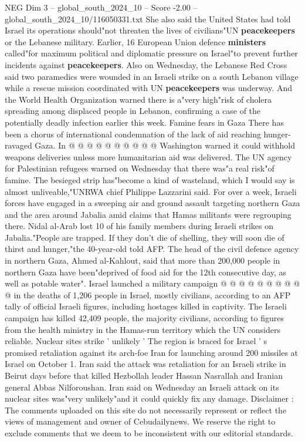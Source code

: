 \begin{textsample}{NEG Dim 3 – global\_south\_2024\_10 – Score -2.00 – global\_south\_2024\_10/116050331.txt}
She also said the United States had told Israel its operations should"not threaten the lives of civilians"UN \textbf{peacekeepers} or the Lebanese military.
Earlier, 16 European Union defence \textbf{ministers} called"for maximum political and diplomatic pressure on Israel"to prevent further incidents against \textbf{peacekeepers}.
Also on Wednesday, the Lebanese Red Cross said two paramedics were wounded in an Israeli strike on a south Lebanon village while a rescue mission coordinated with UN \textbf{peacekeepers} was underway.
And the World Health Organization warned there is a"very high"risk of cholera spreading among displaced people in Lebanon, confirming a case of the potentially deadly infection earlier this week.
Famine fears in Gaza There has been a chorus of international condemnation of the lack of aid reaching hunger-ravaged Gaza.
In @ @ @ @ @ @ @ @ @ @ Washington warned it could withhold weapons deliveries unless more humanitarian aid was delivered.
The UN agency for Palestinian refugees warned on Wednesday that there was"a real risk"of famine.
The besieged strip has"become a kind of wasteland, which I would say is almost unliveable,"UNRWA chief Philippe Lazzarini said.
For over a week, Israeli forces have engaged in a sweeping air and ground assault targeting northern Gaza and the area around Jabalia amid claims that Hamas militants were regrouping there.
Nidal al-Arab lost 10 of his family members during Israeli strikes on Jabalia."People are trapped.
If they don't die of shelling, they will soon die of thirst and hunger,"the 40-year-old told AFP.
The head of the civil defence agency in northern Gaza, Ahmed al-Kahlout, said that more than 200,000 people in northern Gaza have been"deprived of food aid for the 12th consecutive day, as well as potable water".
Israel launched a military campaign @ @ @ @ @ @ @ @ @ @ in the deaths of 1,206 people in Israel, mostly civilians, according to an AFP tally of official Israeli figures, including hostages killed in captivity.
The Israeli campaign has killed 42,409 people, the majority civilians, according to figures from the health ministry in the Hamas-run territory which the UN considers reliable.
Nuclear sites strike ' unlikely ' The region is braced for Israel ' s promised retaliation against its arch-foe Iran for launching around 200 missiles at Israel on October 1.
Iran said the attack was retaliation for an Israeli strike in Beirut days before that killed Hezbollah leader Hassan Nasrallah and Iranian general Abbas Nilforoushan.
Iran said on Wednesday an Israeli attack on its nuclear sites was"very unlikely"and it could quickly fix any damage.
Disclaimer : The comments uploaded on this site do not necessarily represent or reflect the views of management and owner of Cebudailynews.
We reserve the right to exclude comments that we deem to be inconsistent with our editorial standards.

\end{textsample}
